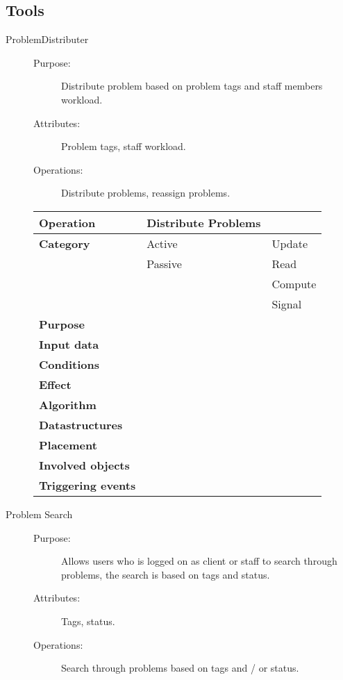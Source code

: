 \subsection{Tools}

\begin{description}
\item[ProblemDistributer]\hfill
\begin{description}
\item[Purpose:]Distribute problem based on problem tags and staff members workload.
\item[Attributes:]Problem tags, staff workload.
\item[Operations:]Distribute problems, reassign problems.
\end{description}
\end{description}

\begin{figure}
\begin{tabular}{p{3.5cm} p{4cm} p{4cm}}
\hline
\textbf{Operation}&Distribute Problems\\
\hline
\textbf{Category}&\underline{ }Active&\underline{ }Update\\
&\underline{ }Passive&\underline{ }Read\\
&&\underline{ }Compute\\
&&\underline{ }Signal\\
\textbf{Purpose}&\multicolumn{2}{p{8cm}}{}\\
\textbf{Input data}&\multicolumn{2}{p{8cm}}{}\\
\textbf{Conditions}&\multicolumn{2}{p{8cm}}{}\\
\textbf{Effect}&\multicolumn{2}{p{8cm}}{}\\
\textbf{Algorithm}&\multicolumn{2}{p{8cm}}{}\\
\textbf{Datastructures}&\multicolumn{2}{p{8cm}}{}\\
\textbf{Placement}&\multicolumn{2}{p{8cm}}{}\\
\textbf{Involved objects}&\multicolumn{2}{p{8cm}}{}\\
\textbf{Triggering events}&\multicolumn{2}{p{8cm}}{}\\
\hline
\end{tabular}
\end{figure}

\begin{description}
\item[Problem Search]\hfill
\begin{description}
\item[Purpose:]Allows users who is logged on as client or staff to search through problems, the search is based on tags and status.
\item[Attributes:]Tags, status.
\item[Operations:]Search through problems based on tags and / or status.
\end{description}
\end{description}

